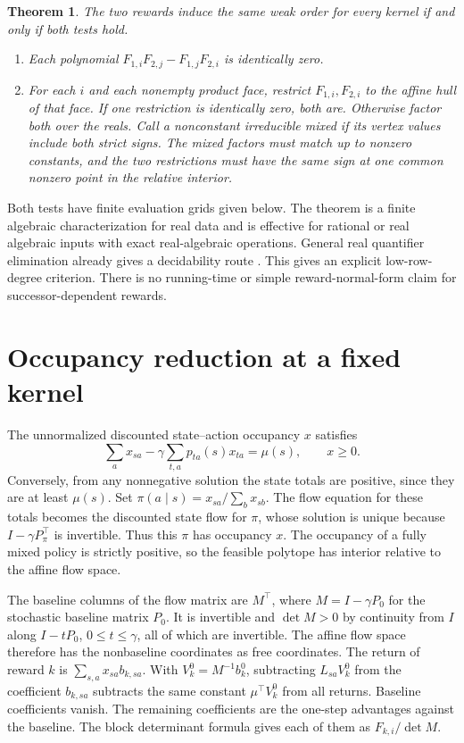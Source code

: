 \documentclass[11pt,a4paper]{amsart}
\newtheorem{theorem}{Theorem}
\begin{document}
\begin{theorem}\label{thm:criterion}
The two rewards induce the same weak order for every kernel if and only if both tests hold.
\begin{enumerate}
\item Each polynomial $F_{1,i}F_{2,j}-F_{1,j}F_{2,i}$ is identically zero.
\item For each $i$ and each nonempty product face, restrict $F_{1,i},F_{2,i}$ to the affine hull of that face. If one restriction is identically zero, both are. Otherwise factor both over the reals. Call a nonconstant irreducible \emph{mixed} if its vertex values include both strict signs. The mixed factors must match up to nonzero constants, and the two restrictions must have the same sign at one common nonzero point in the relative interior.
\end{enumerate}
\end{theorem}

Both tests have finite evaluation grids given below. The theorem is a finite algebraic characterization for real data and is effective for rational or real algebraic inputs with exact real-algebraic operations. General real quantifier elimination already gives a decidability route \cite{basu}. This gives an explicit low-row-degree criterion. There is no running-time or simple reward-normal-form claim for successor-dependent rewards.

\section{Occupancy reduction at a fixed kernel}
The unnormalized discounted state--action occupancy $x$ satisfies
\[
       \sum_a x_{sa}-\gamma\sum_{t,a}p_{ta}(s)x_{ta}=\mu(s),\qquad x\geq0.
\]
Conversely, from any nonnegative solution the state totals are positive, since they are at least $\mu(s)$. Set $\pi(a\mid s)=x_{sa}/\sum_b x_{sb}$. The flow equation for these totals becomes the discounted state flow for $\pi$, whose solution is unique because $I-\gamma P_\pi^{\top}$ is invertible. Thus this $\pi$ has occupancy $x$. The occupancy of a fully mixed policy is strictly positive, so the feasible polytope has interior relative to the affine flow space.

The baseline columns of the flow matrix are $M^{\top}$, where $M=I-\gamma P_0$ for the stochastic baseline matrix $P_0$. It is invertible and $\det M>0$ by continuity from $I$ along $I-tP_0$, $0\leq t\leq\gamma$, all of which are invertible. The affine flow space therefore has the nonbaseline coordinates as free coordinates. The return of reward $k$ is $\sum_{s,a}x_{sa}b_{k,sa}$. With $V_k^0=M^{-1}b_k^0$, subtracting $L_{sa}V_k^0$ from the coefficient $b_{k,sa}$ subtracts the same constant $\mu^{\top}V_k^0$ from all returns. Baseline coefficients vanish. The remaining coefficients are the one-step advantages against the baseline. The block determinant formula gives each of them as $F_{k,i}/\det M$.
\end{document}
